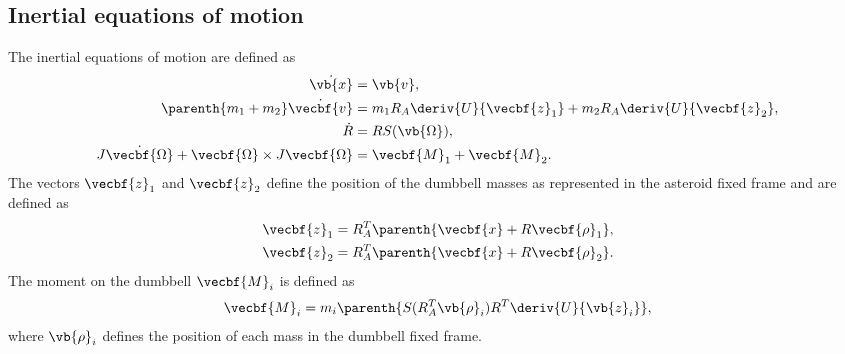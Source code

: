 \documentclass[11pt, reqno]{article}    %
\begin{document}
\subsection[Inertial EOMs]{Inertial equations of motion}\label{sec:inertial_eoms}

The inertial equations of motion are defined as
\begin{align}
    \dot{\vb{x}} &= \vb{v}, \\
    \parenth{m_1 + m_2} \dot{\vecbf{v}} &= m_1 R_A \deriv{U}{\vecbf{z}_1} + m_2 R_A \deriv{U}{\vecbf{z}_2}, \\
    \dot{R} &= R S(\vb{\Omega}) , \\
    J \dot{\vecbf{\Omega}} + \vecbf{\Omega} \times J \vecbf{\Omega} &= \vecbf{M}_1 + \vecbf{M}_2.
\end{align}
The vectors \( \vecbf{z}_1 \) and \( \vecbf{z}_2\) define the position of the dumbbell masses as represented in the asteroid fixed frame and are defined as
\begin{align}
    \vecbf{z}_1 &= R_A^T \parenth{\vecbf{x} + R \vecbf{\rho}_1} , \\
    \vecbf{z}_2 &= R_A^T \parenth{\vecbf{x} + R \vecbf{\rho}_2}.
\end{align}
The moment on the dumbbell \( \vecbf{M}_i\) is defined as
\begin{align}
    \vecbf{M}_i = m_i \parenth{S(R_A^T \vb{\rho}_i) R^T \deriv{U}{\vb{z}_i}}, 
\end{align}
where \( \vb{\rho}_i \) defines the position of each mass in the dumbbell fixed frame.
\end{document}
